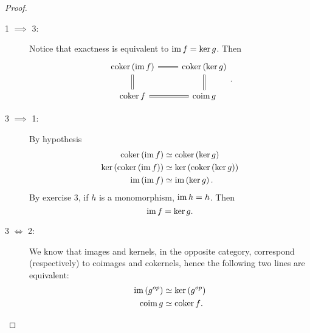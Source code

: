\documentclass[../Main]{subfiles}
\begin{document}
\begin{proof}\leavevmode\vspace{-.2\baselineskip}
	\begin{description}
		\item[1 $\implies$ 3:]
			Notice that exactness is equivalent to $\operatorname{im} f = \ker g$.
			Then
			\begin{equation}
			\begin{tikzcd}
				\mathrm{coker} \left( \ima f \right) \arrow[r, "", equals]
				\arrow[d, "", equals] &
				\mathrm{coker} \left( \ker g \right) \arrow[d, "", equals] \\
				\mathrm{coker}\, f \arrow[r, "", equals] &
				\mathrm{coim}\, g
			\end{tikzcd}
			.\end{equation} 

		\item[3 $\implies$ 1:] By hypothesis
			\begin{align}
				\mathrm{coker} \left( \operatorname{im} f \right) &\simeq
				\mathrm{coker} \left( \ker g \right)\\
				\ker \left( \mathrm{coker} \left( \operatorname{im} f \right) \right) &\simeq
				\ker \left( \mathrm{coker} \left( \ker g \right) \right)\\
				\operatorname{im} \left( \operatorname{im} f \right) &\simeq \operatorname{im} \left( \ker g \right)
			.\end{align} 
			By exercise $3$, if $h$ is a monomorphism, $\operatorname{im} h = h$.
			Then
			\begin{equation}
			\operatorname{im} f = \ker g
			.\end{equation} 

		\item[3 $\iff$ 2:] We know that images and kernels, in the opposite category, correspond
			(respectively) to coimages and cokernels, hence the following two lines are equivalent:
			\begin{align}
				\operatorname{im} \left( g^{op} \right) &\simeq \ker \left( g^{op} \right)\\
				\mathrm{coim}\, g &\simeq \mathrm{coker}\, f\nonumber\qedhere
			.\end{align} 
	\end{description} 
\end{proof}
\end{document}
